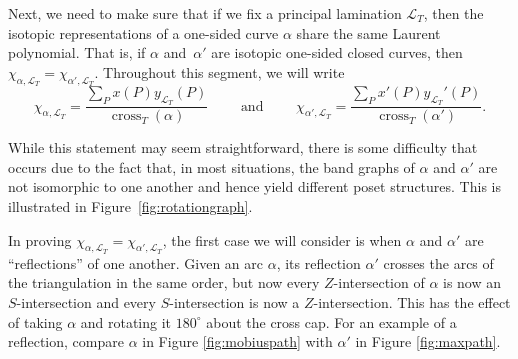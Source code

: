 \documentclass[10pt,a4paper]{amsart}
\numberwithin{equation}{section}
\theoremstyle{definition}
\begin{document}
Next, we need to make sure that if we fix a principal lamination $\mathcal{L}_T$, then the isotopic representations of a one-sided curve $\alpha$ share the same Laurent polynomial. That is, if $\alpha$ and~$\alpha'$ are isotopic one-sided closed curves, then $\chi_{\alpha, \mathcal{L}_T}=\chi_{\alpha', \mathcal{L}_T}$. Throughout this segment, we will write \[\chi_{\alpha, \mathcal{L}_T}=\frac{\sum_P x(P)y_{\mathcal{L}_T}(P)}{\operatorname{cross}_T(\alpha)}\qquad \text{ and } \qquad \chi_{\alpha', \mathcal{L}_T}=\frac{\sum_{P} x'(P)y_{\mathcal{L}_T}'(P)}{\operatorname{cross}_T(\alpha')}.\]

While this statement may seem straightforward, there is some difficulty that occurs due to the fact that, in most situations, the band graphs of $\alpha$ and $\alpha'$ are not isomorphic to one another and hence yield different poset structures. This is illustrated in Figure~\ref{fig:rotationgraph}.

In proving $\chi_{\alpha, \mathcal{L}_T}=\chi_{\alpha', \mathcal{L}_T}$, the first case we will consider is when $\alpha$ and $\alpha'$ are ``reflections'' of one another. Given an arc $\alpha$, its reflection $\alpha'$ crosses the arcs of the triangulation in the same order, but now every $Z$-intersection of $\alpha$ is now an $S$-intersection and every $S$-intersection is now a $Z$-intersection. This has the effect of taking $\alpha$ and rotating it $180^{\circ}$ about the cross cap. For an example of a reflection, compare $\alpha$ in Figure \ref{fig:mobiuspath} with $\alpha'$ in Figure \ref{fig:maxpath}.
\end{document}
